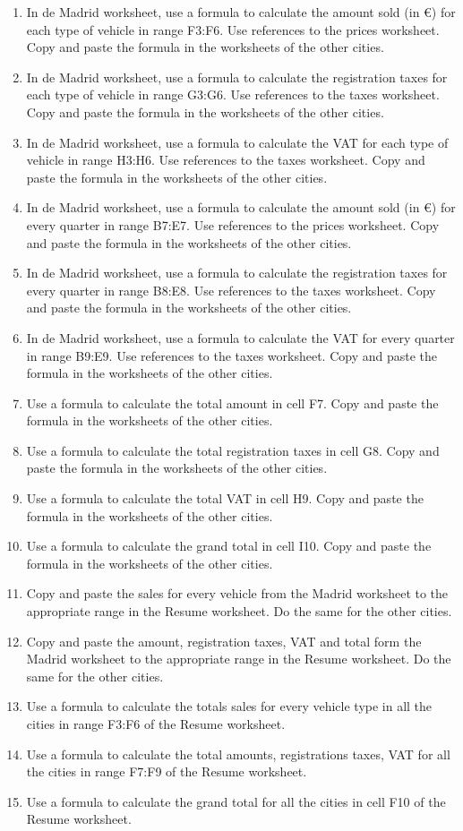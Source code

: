 \begin{enumerate}[leftmargin=*,resume]
\begin{enumerate}
\item In de Madrid worksheet, use a formula to calculate the amount sold (in €) for each type of vehicle in range F3:F6.
Use references to the prices worksheet. 
Copy and paste the formula in the worksheets of the other cities. 
\item In de Madrid worksheet, use a formula to calculate the registration taxes for each type of vehicle in range G3:G6.
Use references to the taxes worksheet. 
Copy and paste the formula in the worksheets of the other cities.
\item In de Madrid worksheet, use a formula to calculate the VAT for each type of vehicle in range H3:H6.
Use references to the taxes worksheet. 
Copy and paste the formula in the worksheets of the other cities.
\item In de Madrid worksheet, use a formula to calculate the amount sold (in €) for every quarter in range
B7:E7.
Use references to the prices worksheet. 
Copy and paste the formula in the worksheets of the other cities.
\item In de Madrid worksheet, use a formula to calculate the registration taxes for every quarter in range
B8:E8.
Use references to the taxes worksheet. 
Copy and paste the formula in the worksheets of the other cities.
\item In de Madrid worksheet, use a formula to calculate the VAT for every quarter in range
B9:E9.
Use references to the taxes worksheet. 
Copy and paste the formula in the worksheets of the other cities.
\item Use a formula to calculate the total amount in cell F7.
Copy and paste the formula in the worksheets of the other cities.  
\item Use a formula to calculate the total registration taxes in cell G8.
Copy and paste the formula in the worksheets of the other cities.  
\item Use a formula to calculate the total VAT in cell H9.
Copy and paste the formula in the worksheets of the other cities. 
\item Use a formula to calculate the grand total in cell I10.
Copy and paste the formula in the worksheets of the other cities.
\item Copy and paste the sales for every vehicle from the Madrid worksheet to the appropriate range in the Resume
worksheet.
Do the same for the other cities.  
\item Copy and paste the amount, registration taxes, VAT and total form the Madrid worksheet to the appropriate
range in the Resume worksheet. 
Do the same for the other cities. 
\item Use a formula to calculate the totals sales for every vehicle type in all the cities in range F3:F6 of the Resume
worksheet. 
\item Use a formula to calculate the total amounts, registrations taxes, VAT for all the cities in range F7:F9 of the
Resume worksheet. 
\item Use a formula to calculate the grand total for all the cities in cell F10 of the Resume worksheet. 
\end{enumerate} 


\end{enumerate}
